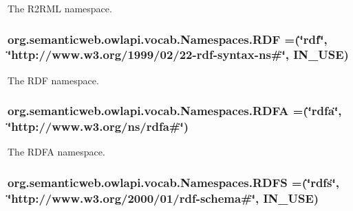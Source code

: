 The R2\-R\-M\-L namespace. \hypertarget{enumorg_1_1semanticweb_1_1owlapi_1_1vocab_1_1_namespaces_a0d1c7991e82e2b5c495bb87f1123ce30}{
\subsubsection[{R\-D\-F}]{\setlength{\rightskip}{0pt plus 5cm}org.\-semanticweb.\-owlapi.\-vocab.\-Namespaces.\-R\-D\-F =(\char`\"{}rdf\char`\"{}, \char`\"{}http\-://www.\-w3.\-org/1999/02/22-\/rdf-\/syntax-\/{\bf ns}\#\char`\"{}, I\-N\-\_\-\-U\-S\-E)}}\label{enumorg_1_1semanticweb_1_1owlapi_1_1vocab_1_1_namespaces_a0d1c7991e82e2b5c495bb87f1123ce30}
The R\-D\-F namespace. \hypertarget{enumorg_1_1semanticweb_1_1owlapi_1_1vocab_1_1_namespaces_a537bb90d86b38d02fa6d39c07cd69b53}{
\subsubsection[{R\-D\-F\-A}]{\setlength{\rightskip}{0pt plus 5cm}org.\-semanticweb.\-owlapi.\-vocab.\-Namespaces.\-R\-D\-F\-A =(\char`\"{}rdfa\char`\"{}, \char`\"{}http\-://www.\-w3.\-org/{\bf ns}/rdfa\#\char`\"{})}}\label{enumorg_1_1semanticweb_1_1owlapi_1_1vocab_1_1_namespaces_a537bb90d86b38d02fa6d39c07cd69b53}
The R\-D\-F\-A namespace. \hypertarget{enumorg_1_1semanticweb_1_1owlapi_1_1vocab_1_1_namespaces_a64d32d1177b8a61cc6da656defd88a5a}{
\subsubsection[{R\-D\-F\-S}]{\setlength{\rightskip}{0pt plus 5cm}org.\-semanticweb.\-owlapi.\-vocab.\-Namespaces.\-R\-D\-F\-S =(\char`\"{}rdfs\char`\"{}, \char`\"{}http\-://www.\-w3.\-org/2000/01/rdf-\/schema\#\char`\"{}, I\-N\-\_\-\-U\-S\-E)}}\label{enumorg_1_1semanticweb_1_1owlapi_1_1vocab_1_1_namespaces_a64d32d1177b8a61cc6da656defd88a5a}
